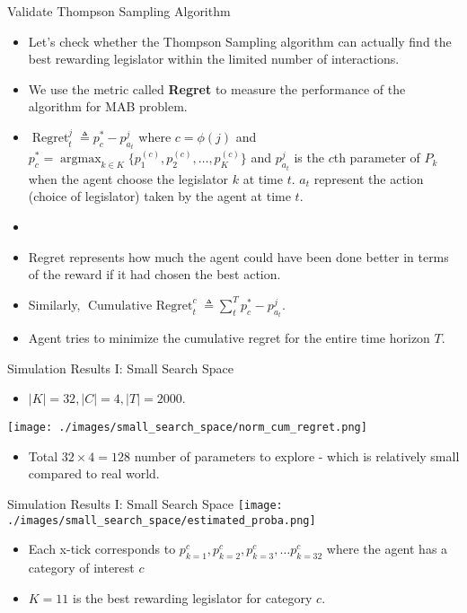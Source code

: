 \documentclass{beamer}
\begin{document}
	\begin{frame}{Validate Thompson Sampling Algorithm}
		\begin{itemize}
			\item Let's check whether the Thompson Sampling algorithm can actually find the best rewarding legislator within the limited number of interactions.
			\item We use the metric called \textbf{Regret} to measure the performance of the algorithm for MAB problem. 
			\item $\operatorname{Regret}_t^j \triangleq p_c^*-p_{a_t}^j$ where $c = \phi(j)$ and $p_c^* = \operatorname{argmax}_{k \in K}\{p_1^{(c)}, p_2^{(c)}, \hdots, p_K^{(c)}\} $ and $p_{a_t}^j$ is the $c$th parameter of $P_k$ when the agent choose the legislator $k$ at time $t$. $a_t$ represent the action (choice of legislator) taken by the agent at time $t$.
			\item \item Regret represents how much the agent could have been done better in terms of the reward if it had chosen the best action.
			\item Similarly, $\operatorname{Cumulative \text{ } Regret}_t^c \triangleq \sum_t^T p_c^*-p_{a_t}^j$.
			\item Agent tries to minimize the cumulative regret for the entire time horizon $T$.
		\end{itemize}
	\end{frame}
	
	\begin{frame}{Simulation Results I: Small Search Space}
		\begin{itemize}
			\item  $|K|=32, |C|=4, |T|=2000$.
		\end{itemize}
		\centering	\texttt{[image: ./images/small\_search\_space/norm\_cum\_regret.png]}
		\begin{itemize}
			\item  Total $32 \times 4 = 128$ number of parameters to explore - which is relatively small compared to real world.
		\end{itemize}
	\end{frame}

	\begin{frame}{Simulation Results I: Small Search Space}
		\centering \texttt{[image: ./images/small\_search\_space/estimated\_proba.png]}
		\begin{itemize}
			\item Each x-tick corresponds to $p_{k=1}^c, p_{k=2}^c, p_{k=3}^c, \hdots p_{k=32}^c$ where the agent has a category of interest $c$
			\item $K=11$ is the best rewarding legislator for category $c$.
		\end{itemize}
	\end{frame}
\end{document}
